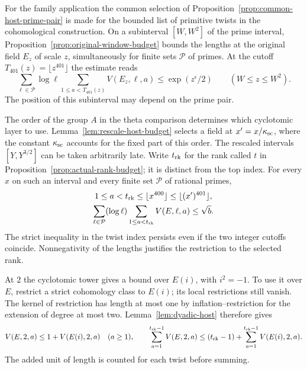 For the family application the common selection of
Proposition~\ref{prop:common-host-prime-pair} is made for the bounded
list of primitive twists in the cohomological construction.
On a subinterval \([W,W^2]\) of the prime interval,
Proposition~\ref{prop:original-window-budget} bounds the lengths at the
original field \(E_z\) of scale \(z\), simultaneously for finite sets
\(\mathcal P\) of primes. At the cutoff \(T_{401}(z)=\lfloor z^{401}\rfloor\)
the estimate reads
\[
 \sum_{\ell\in\mathcal P}\log\ell
        \sum_{1\le a<T_{401}(z)} V(E_z,\ell,a)\le \exp(z^\epsilon/2)
                  \qquad(W\le z\le W^2).
\]
The position of this subinterval may depend on the prime pair.

The order of the group \(A\) in the theta comparison determines which
cyclotomic layer to use. Lemma~\ref{lem:rescale-host-budget}
selects a field at \(x'=x/\kappa_{\rm sc}\), where the constant
\(\kappa_{\rm sc}\) accounts for the fixed part of this order. The
rescaled intervals \([Y,Y^{3/2}]\) can be taken arbitrarily late.
Write \(t_{\rm rk}\) for the rank called \(t\) in
Proposition~\ref{prop:actual-rank-budget}; it is distinct from the
top index. For every \(x\) on such an interval and every finite set
\(\mathcal P\) of rational primes,
\[
 \begin{gathered}
  1\le a<t_{\rm rk}\le\lfloor x^{400}\rfloor
                 \le\lfloor (x')^{401}\rfloor,\\
  \sum_{\ell\in\mathcal P}(\log\ell)
       \sum_{1\le a<t_{\rm rk}}V(E,\ell,a)\le\sqrt b .
 \end{gathered}
\]
The strict inequality in the twist index persists even if the two
integer cutoffs coincide. Nonnegativity of the lengths justifies the
restriction to the selected rank.

At \(2\) the cyclotomic tower gives a bound over \(E(i)\), with
\(i^2=-1\). To use it over \(E\), restrict a strict cohomology
class to \(E(i)\); its local restrictions still vanish. The kernel
of restriction has length at most one by inflation--restriction for
the extension of degree at most two. Lemma~\ref{lem:dyadic-host} therefore gives
\[
 V(E,2,a)\le 1+V(E(i),2,a)\quad(a\ge1),\qquad
 \sum_{a=1}^{t_{\rm rk}-1}V(E,2,a)
 \le (t_{\rm rk}-1)+\sum_{a=1}^{t_{\rm rk}-1}V(E(i),2,a).
\]
The added unit of length is counted for each twist before summing.


